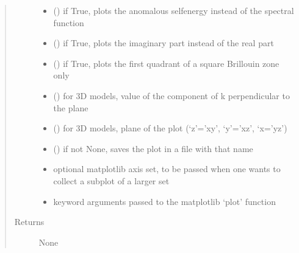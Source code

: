 \documentclass[letterpaper,10pt,english]{sphinxmanual}
\begin{document}
\begin{fulllineitems}
\begin{quote}
\begin{description}
\begin{itemize}
\item {} 
\sphinxAtStartPar
{} () \textendash{} if True, plots the anomalous self\sphinxhyphen{}energy instead of the spectral function

\item {} 
\sphinxAtStartPar
{} () \textendash{} if True, plots the imaginary part instead of the real part

\item {} 
\sphinxAtStartPar
{} () \textendash{} if True, plots the first quadrant of a square Brillouin zone only

\item {} 
\sphinxAtStartPar
{} () \textendash{} for 3D models, value of the component of k perpendicular to the plane

\item {} 
\sphinxAtStartPar
{} () \textendash{} for 3D models, plane of the plot (‘z’=’xy’, ‘y’=’xz’, ‘x=’yz’)

\item {} 
\sphinxAtStartPar
{} () \textendash{} if not None, saves the plot in a file with that name

\item {} 
\sphinxAtStartPar
{} \textendash{} optional matplotlib axis set, to be passed when one wants to collect a subplot of a larger set

\item {} 
\sphinxAtStartPar
{} \textendash{} keyword arguments passed to the matplotlib ‘plot’ function

\end{itemize}

\item[{Returns}] \leavevmode
\sphinxAtStartPar
None

\end{description}\end{quote}

\end{fulllineitems}
\end{document}

